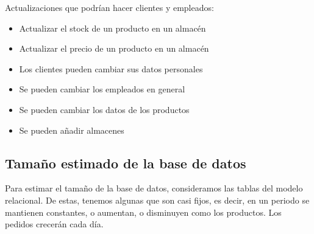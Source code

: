 \documentclass[10pt, a4paper,openany]{report}
\begin{document}
\noindent Actualizaciones que podrían hacer clientes y empleados:
\begin{itemize}
	\item Actualizar el stock de un producto en un almacén
	\item Actualizar el precio de un producto en un almacén
	\item Los clientes pueden cambiar sus datos personales
	\item Se pueden cambiar los empleados en general
	\item Se pueden cambiar los datos de los productos
	\item Se pueden añadir almacenes

\end{itemize}

\subsection{Tamaño estimado de la base de datos}
\label{subsec:Tamaño estimado de la base de datos}

Para estimar el tamaño de la base de datos, consideramos las tablas del modelo relacional. De estas, tenemos algunas que son casi fijos, es decir, en un periodo se mantienen constantes, o aumentan, o disminuyen como los productos. Los pedidos crecerán cada día.
\end{document}
